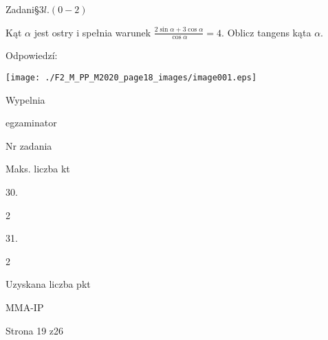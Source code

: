 \documentclass[a4paper,12pt]{article}
\begin{document}
Zadani\S $3l. (0-2)$

Kąt $\alpha$ jest ostry i spełnia warunek $\displaystyle \frac{2\sin\alpha+3\cos\alpha}{\cos\alpha}=4$. Oblicz tangens kąta $\alpha.$

Odpowiedzí:
\begin{center}
\texttt{[image: ./F2\_M\_PP\_M2020\_page18\_images/image001.eps]}
\end{center}
Wypelnia

egzaminator

Nr zadania

Maks. liczba kt

30.

2

31.

2

Uzyskana liczba pkt

MMA-IP

Strona 19 z26
\end{document}
